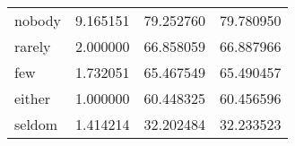 \begin{table}[ht]
\begin{tabular}{lrrr}
nobody & {\cellcolor[HTML]{F9FDCC}} \color[HTML]{000000} 9.165151 & {\cellcolor[HTML]{FBFDD0}} \color[HTML]{000000} 79.252760 & {\cellcolor[HTML]{FBFDD0}} \color[HTML]{000000} 79.780950 \\
rarely & {\cellcolor[HTML]{FEFFD8}} \color[HTML]{000000} 2.000000 & {\cellcolor[HTML]{FCFED3}} \color[HTML]{000000} 66.858059 & {\cellcolor[HTML]{FCFED3}} \color[HTML]{000000} 66.887966 \\
few & {\cellcolor[HTML]{FFFFD9}} \color[HTML]{000000} 1.732051 & {\cellcolor[HTML]{FCFED3}} \color[HTML]{000000} 65.467549 & {\cellcolor[HTML]{FCFED3}} \color[HTML]{000000} 65.490457 \\
either & {\cellcolor[HTML]{FFFFD9}} \color[HTML]{000000} 1.000000 & {\cellcolor[HTML]{FDFED4}} \color[HTML]{000000} 60.448325 & {\cellcolor[HTML]{FDFED4}} \color[HTML]{000000} 60.456596 \\
seldom & {\cellcolor[HTML]{FFFFD9}} \color[HTML]{000000} 1.414214 & {\cellcolor[HTML]{FFFFD9}} \color[HTML]{000000} 32.202484 & {\cellcolor[HTML]{FFFFD9}} \color[HTML]{000000} 32.233523 \\
\bottomrule
\end{tabular}
\end{table}
